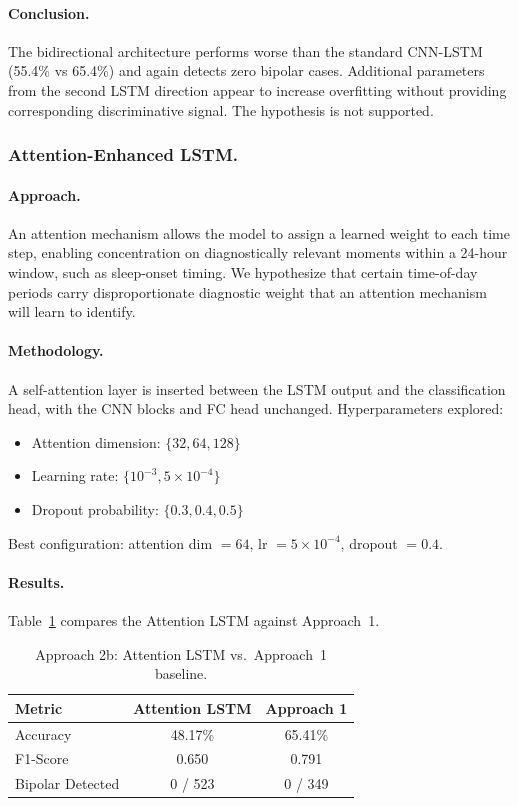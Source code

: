 \paragraph{Conclusion.}
The bidirectional architecture performs worse than the standard CNN-LSTM (55.4\% vs 65.4\%) and again detects zero bipolar cases. Additional parameters from the second LSTM direction appear to increase overfitting without providing corresponding discriminative signal. The hypothesis is not supported.

\subsubsection{Attention-Enhanced LSTM.}

\paragraph{Approach.}
An attention mechanism \cite{bahdanau2015attention} allows the model to assign a learned weight to each time step, enabling concentration on diagnostically relevant moments within a 24-hour window, such as sleep-onset timing. We hypothesize that certain time-of-day periods carry disproportionate diagnostic weight that an attention mechanism will learn to identify.

\paragraph{Methodology.}
A self-attention layer is inserted between the LSTM output and the classification head, with the CNN blocks and FC head unchanged. Hyperparameters explored:
\begin{itemize}[nosep]
  \item Attention dimension: $\{32, 64, 128\}$
  \item Learning rate: $\{10^{-3}, 5 \times 10^{-4}\}$
  \item Dropout probability: $\{0.3, 0.4, 0.5\}$
\end{itemize}
Best configuration: attention dim $= 64$, lr $= 5 \times 10^{-4}$, dropout $= 0.4$.

\paragraph{Results.}
Table~\ref{tab:approach2b_results} compares the Attention LSTM against Approach~1.

\begin{table}[H]
\centering
\caption{Approach 2b: Attention LSTM vs.\ Approach~1 baseline.}
\label{tab:approach2b_results}
\begin{tabular}{lcc}
\toprule
\textbf{Metric} & \textbf{Attention LSTM} & \textbf{Approach 1} \\
\midrule
Accuracy & 48.17\% & 65.41\% \\
F1-Score & 0.650 & 0.791 \\
Bipolar Detected & 0 / 523 & 0 / 349 \\
\bottomrule
\end{tabular}
\end{table}

